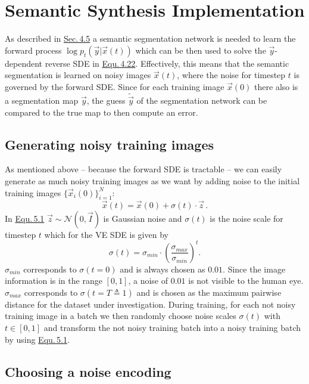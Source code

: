 \section{Semantic Synthesis Implementation} \label{sec:5.2}
As described in \hyperref[sec:4.5]{Sec.\,4.5} a semantic segmentation network is needed to learn the forward process $\log p_t(\vec{y}|\vec{x}(t))$ which can be then used to solve the $\vec{y}$-dependent reverse SDE in \hyperref[equ:4.22]{Equ.\,4.22}. Effectively, this means that the semantic segmentation is learned on noisy images $\vec{x}(t)$, where the noise for timestep $t$ is governed by the forward SDE. Since for each training image $\vec{x}(0)$ there also is a segmentation map $\vec{y}$, the guess $\tilde{\vec{y}}$ of the segmentation network can be compared to the true map to then compute an error. 

\subsection{Generating noisy training images}

As mentioned above – because the forward SDE is tractable – we can easily generate as much noisy training images as we want by adding noise to the initial training images $\{\vec{x}_i(0)\}_{i=1}^N$:
%
\begin{equation} \label{equ:5.1}
    \vec{x}(t)=\vec{x}(0)+\sigma(t)\cdot\vec{z}\,.
\end{equation}
%
In \hyperref[equ:5.1]{Equ.\,5.1} $\vec{z}\sim\mathcal{N}(0, \vec{I})$ is Gaussian noise and $\sigma(t)$ is the noise scale for timestep $t$ which for the VE SDE is given by
%
\begin{equation} \label{5.2}
    \sigma(t)=\sigma_{min}\cdot\left(\frac{\sigma_{max}}{\sigma_{min}}\right)^t.
\end{equation}
%
$\sigma_{min}$ corresponds to $\sigma(t=0)$ and is always chosen as $0.01$. Since the image information is in the range $[0,1]$, a noise of $0.01$ is not visible to the human eye. $\sigma_{max}$ corresponds to $\sigma(t=T\triangleq1)$ and is chosen as the maximum pairwise distance for the dataset under investigation. During training, for each not noisy training image in a batch we then randomly choose noise scales $\sigma(t)$ with $t\in[0,1]$ and transform the not noisy training batch into a noisy training batch by using \hyperref[equ:5.1]{Equ.\,5.1}.

\subsection{Choosing a noise encoding}

